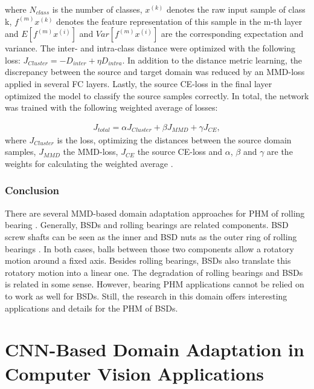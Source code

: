 where $N_{class}$ is the number of classes, $x^{(k)}$ denotes the raw input sample of class k, $f^{(m)}x^{(k)}$ denotes the feature representation of this sample in the m-th layer and $E[f^{(m)}x^{(i)}]$ and $Var[f^{(m)}x^{(i)}]$ are the corresponding expectation and variance. The inter- and intra-class distance were optimized with the following loss: $J_{Cluster} = - D_{inter} + \eta D_{intra}$. In addition to the distance metric learning, the discrepancy between the source and target domain was reduced by an MMD-loss applied in several FC layers. Lastly, the source CE-loss in the final layer optimized the model to classify the source samples correctly. In total, the network was trained with the following weighted average of losses: 

\begin{equation}
    \begin{aligned}
    J_{total} = \alpha J_{Cluster} + \beta J_{MMD} + \gamma J_{CE}, 
    \end{aligned}
\end{equation}
where $J_{Cluster}$ is the loss, optimizing the distances between the source domain samples, $J_{MMD}$ the MMD-loss,  $J_{CE}$ the source CE-loss and $\alpha$, $\beta$ and $\gamma$ are the weights for calculating the weighted average \cite{Li2018}.

\subsubsection{Conclusion}
There are several MMD-based domain adaptation approaches for PHM of rolling bearing \cite{AN201942} \cite{Li2018} \cite{Guo2019} \cite{Singh2019} \cite{Kang2020}. Generally, BSDs and rolling bearings are related components. BSD screw shafts can be seen as the inner and BSD nuts as the outer ring of rolling bearings \cite{Lee2015}. In both cases, balls between those two components allow a rotatory motion around a fixed axis. Besides rolling bearings, BSDs also translate this rotatory motion into a linear one. The degradation of rolling bearings and BSDs is related in some sense. However, bearing PHM applications cannot be relied on to work as well for BSDs. Still, the research in this domain offers interesting applications and details for the PHM of BSDs. 

\section{CNN-Based Domain Adaptation in Computer Vision Applications} \label{sec:domain_adaption_CV}

